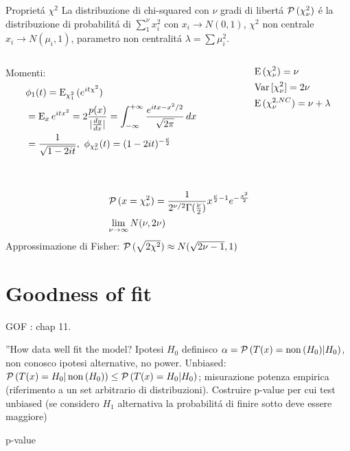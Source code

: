 \begin{frame}{Propriet\'a $\chi^2$}
La distribuzione di chi-squared con $\nu$ gradi di libert\'a $\operatorname{\mathcal{P}}{(\chi_{\nu}^2)}$ \'e la distribuzione di probabilit\'a di $\sum_1^{\nu}x_i^2$ con $x_i\to N(0,1)$, $\chi^2$ non centrale $x_i\to N(\mu_i,1)$, parametro non centralit\'a $\lambda=\sum\mu_i^2$.
\begin{columns}[T]
\begin{column}{0.7\textwidth}
Momenti:
\begin{align*}
&\phi_1(t)=\E_{\chi^2_1}{(\exp{it\chi^2})}\\
&=\E_x{\exp{itx^2}}=2\frac{p(x)}{|\TDy{x}{y}|}=\intsinf{}\frac{\exp{itx-x^2/2}}{\sqrt{2\pi}}\,dx\\
&=\frac{1}{\sqrt{1-2it}},\ \phi_{\chi^2_{\nu}}(t)=(1-2it)\expy{-\frac{\nu}{2}}\\
&
\end{align*}
\end{column}
\begin{column}{0.3\textwidth}
\begin{align*}
&\operatorname{E}{(\chi^2_{\nu})}=\nu\\
&\operatorname{Var}{[\chi_{\nu}^2]}=2\nu\\
&\operatorname{E}{(\chi^{2,NC}_{\nu})}=\nu+\lambda
\end{align*}
\end{column}
\end{columns}
\begin{align*}
&\operatorname{\mathcal{P}}{(x=\chi^2_{\nu})}=\frac{1}{2^{\nu/2}\Gamma(\frac{\nu}{2})}x^{\frac{\nu}{2}-1}e^{-\frac{x^2}{2}}\\
&\lim_{\nu\to\infty}N(\nu,2\nu)
\end{align*}
Approssimazione di Fisher: $\operatorname{\mathcal{P}}{(\sqrt{2\chi^2})}\approx N(\sqrt{2\nu-1},1)$
\end{frame}

\section{Goodness of fit}

\begin{wordonframe}{GOF}
	\cite{james2006statistical}: chap 11.
	
''How data well fit the model?
Ipotesi $H_0$ definisco $\alpha=\operatorname{\mathcal{P}}{(T(x)=\operatorname{non}{(H_0)}|H_0)}$, non conosco ipotesi alternative, no power.
Unbiased: $\operatorname{\mathcal{P}}{(T(x)=H_0|\operatorname{non}{(H_0)})}\leq\operatorname{\mathcal{P}}{(T(x)=H_0|H_0)}$; misurazione potenza empirica (riferimento a un set arbitrario di distribuzioni).
Costruire p-value per cui test unbiased (se considero $H_1$ alternativa la probabilit\'a di finire sotto deve essere maggiore)
\end{wordonframe}

\begin{frame}{p-value}
\end{frame}